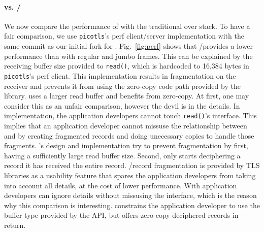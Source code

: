 
\paragraph*{\tcpls vs. \tls/\tcp} We now compare the performance of \tcpls with
the traditional \tls over \tcp stack. To have a fair comparison, we use
\texttt{picotls}'s perf client/server
implementation with the same commit as our initial fork for \tcpls.
Fig.~\ref{fig:perf} shows that \tls/\tcp provides a lower performance than
\tcpls with regular and jumbo frames. This can be explained by the receiving
buffer size provided to \texttt{read()}, which is hardcoded to 16,384 bytes
in \texttt{picotls}'s perf client. This implementation results in fragmentation on the
receiver and prevents it from using the zero-copy code path provided by the
library. \tcpls uses a larger read buffer and benefits from zero-copy. At first,
one may consider this as an unfair comparison, however the devil is in the
details. In \tcpls implementation, the application developers cannot touch
\texttt{read()}'s interface. This implies that an application developer cannot
missuse the relationship between \tls and \tcp by creating fragmented records
and doing unecessary copies to handle those fragments. \tcpls's design and
implementation try to prevent fragmentation by first, having a sufficiently
large read buffer size. Second, \tcpls only starts deciphering a record it has
received the entire record. \tls/\tcp record fragmentation is provided by TLS
libraries as a usability feature that spares the application developers from
taking into account all \tls details, at the cost of lower performance.  With
\tcpls application developers can ignore \tls details without missusing the
interface, which is the reason why this comparison is interesting.\tcpls
constrains the application developer to use the buffer type provided by the API,
but offers zero-copy deciphered records in return.


